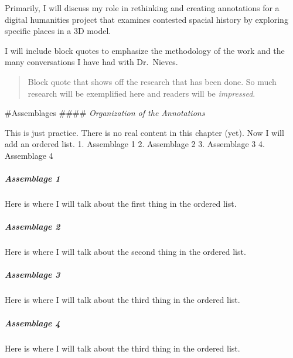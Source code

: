 \documentclass[
  openany]{book}
\begin{document}
Primarily, I will discuss my role in rethinking and creating annotations for a digital humanities project that examines contested spacial history by exploring specific places in a 3D model.

I will include block quotes to emphasize the methodology of the work and the many conversations I have had with Dr.~Nieves.

\begin{quote}
Block quote that shows off the research that has been done. So much research will be exemplified here and readers will be \emph{impressed}.
\end{quote}

\#Assemblages
\#\#\#\# \emph{Organization of the Annotations}

This is just practice. There is no real content in this chapter (yet).
Now I will add an ordered list.
1. Assemblage 1
2. Assemblage 2
3. Assemblage 3
4. Assemblage 4

\hypertarget{assemblage-1}{%
\subparagraph{Assemblage 1}\label{assemblage-1}}

Here is where I will talk about the first thing in the ordered list.

\hypertarget{assemblage-2}{%
\subparagraph{Assemblage 2}\label{assemblage-2}}

Here is where I will talk about the second thing in the ordered list.

\hypertarget{assemblage-3}{%
\subparagraph{Assemblage 3}\label{assemblage-3}}

Here is where I will talk about the third thing in the ordered list.

\hypertarget{assemblage-4}{%
\subparagraph{Assemblage 4}\label{assemblage-4}}

Here is where I will talk about the third thing in the ordered list.
\end{document}
